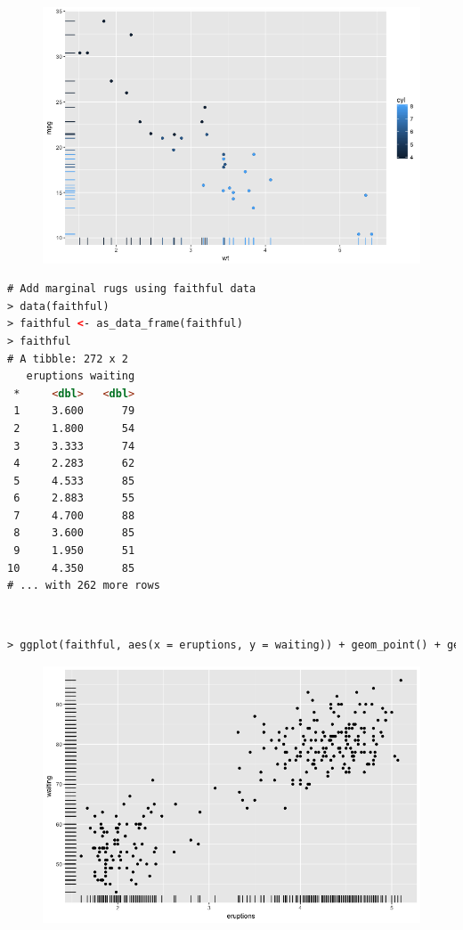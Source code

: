 \begin{figure}[H]\begin{center}\includegraphics[scale=1 ]{ilu/bg51.png}\end{center}\end{figure}
\begin{lstlisting}[language=html]
# Add marginal rugs using faithful data
> data(faithful)
> faithful <- as_data_frame(faithful)
> faithful
# A tibble: 272 x 2
   eruptions waiting
 *     <dbl>   <dbl>
 1     3.600      79
 2     1.800      54
 3     3.333      74
 4     2.283      62
 5     4.533      85
 6     2.883      55
 7     4.700      88
 8     3.600      85
 9     1.950      51
10     4.350      85
# ... with 262 more rows
\end{lstlisting}
\textcolor{white}{.}\newline
\begin{lstlisting}[language=html]
> ggplot(faithful, aes(x = eruptions, y = waiting)) + geom_point() + geom_rug()
\end{lstlisting}
\begin{figure}[H]\begin{center}\includegraphics[scale=1 ]{ilu/bg52.png}\end{center}\end{figure}
